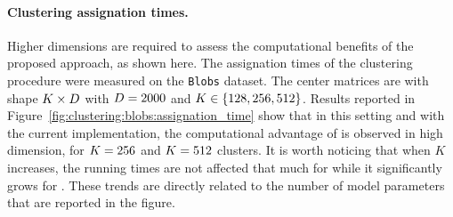 \paragraph{Clustering assignation times.}
Higher dimensions are required to assess the computational benefits of the proposed approach, as shown here.
The assignation times of the clustering procedure were measured on the \texttt{Blobs} dataset.
The center matrices are with shape $K \times D$ with $D=2000$  and $K\in\left \lbrace 128, 256, 512\right \rbrace$.
Results reported in Figure~\ref{fig:clustering:blobs:assignation_time} show that in this setting and with the current implementation, the computational advantage of \qkmeans is observed in high dimension, for $K=256$ and $K=512$ clusters. It is worth noticing that when $K$ increases, the running times are not affected that much for \qkmeans while it significantly grows for \kmeans. These trends are directly related to the number of model parameters that are reported in the figure.





